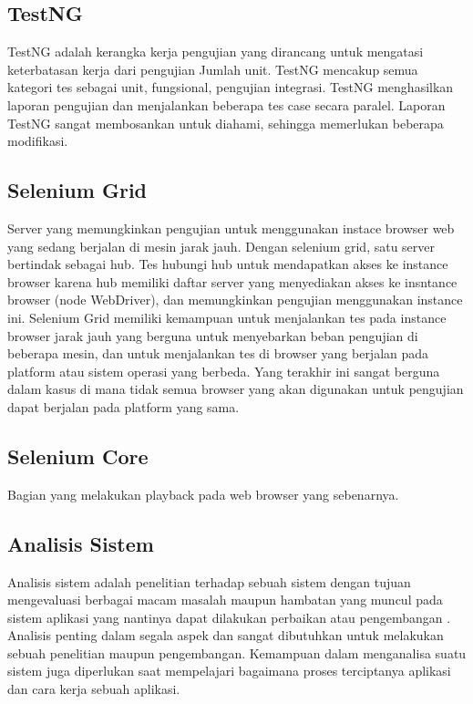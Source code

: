 \subsection{TestNG}
TestNG adalah kerangka kerja pengujian yang dirancang untuk mengatasi keterbatasan kerja dari pengujian Jumlah unit. TestNG mencakup semua kategori tes sebagai unit, fungsional, pengujian integrasi. TestNG menghasilkan laporan pengujian dan menjalankan beberapa tes case secara paralel. Laporan TestNG sangat membosankan untuk diahami, sehingga memerlukan beberapa modifikasi.

\subsection{Selenium Grid}
Server yang memungkinkan pengujian untuk menggunakan instace browser web yang sedang berjalan di mesin jarak jauh. Dengan selenium grid, satu server bertindak sebagai hub\cite{razak2011agile}. Tes hubungi hub untuk mendapatkan akses ke instance browser karena hub memiliki daftar server yang menyediakan akses ke insntance browser (node WebDriver), dan memungkinkan pengujian menggunakan instance ini. Selenium Grid memiliki kemampuan untuk menjalankan tes pada instance browser jarak jauh yang berguna untuk menyebarkan beban pengujian di beberapa mesin, dan untuk menjalankan tes di browser yang berjalan pada platform atau sistem operasi yang berbeda. Yang terakhir ini sangat berguna dalam kasus di mana tidak semua browser yang akan digunakan untuk pengujian dapat berjalan pada platform yang sama.

\subsection{Selenium Core}
Bagian yang melakukan playback pada web browser yang sebenarnya.

\subsection{Analisis Sistem}
Analisis sistem adalah penelitian terhadap sebuah sistem dengan tujuan mengevaluasi berbagai macam masalah maupun hambatan yang muncul pada sistem aplikasi yang nantinya dapat dilakukan perbaikan atau pengembangan \cite{aini2007sistem}. Analisis penting dalam segala aspek dan sangat dibutuhkan untuk melakukan sebuah penelitian maupun pengembangan. Kemampuan dalam menganalisa suatu sistem juga diperlukan saat mempelajari bagaimana proses terciptanya aplikasi dan cara kerja sebuah aplikasi.

